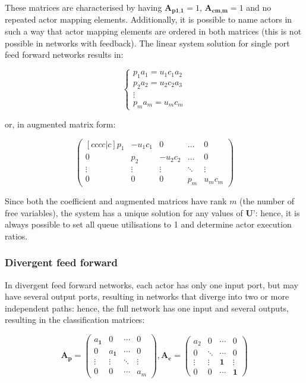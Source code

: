 These matrices are characterised by having $\textbf{A}_{\textbf{p1,1}}=1$, $\textbf{A}_{\textbf{cm,m}}=1$ and no repeated actor mapping elements. Additionally, it is possible to name actors in such a way that actor mapping elements are ordered in both matrices (this is not possible in networks with feedback). The linear system solution for single port feed forward networks results in:

\begin{equation}
 \begin{cases} 
 p_1a_1=u_1c_1 a_2 \\
p_2 a_2=u_2 c_2 a_3 \\
\vdots \\
p_m a_m=u_m  c_m
\end{cases}
\label{eq:solvable}
\end{equation}

or, in augmented matrix form:

\begin{equation}
\begin{pmatrix}[cccc|c]
  p_1 & -u_1c_1 & 0 & \hdots & 0   \\
  0 & p_2 & -u_2c_2 & \hdots  &0  \\
  \vdots & \vdots &  \vdots & \ddots & \vdots \\
  0 & 0 & 0 & p_m & u_mc_m  
 \end{pmatrix}
\end{equation}

Since both the coefficient and augmented matrices have rank $m$ (the number of free variables), the system has a unique solution for any values of $\textbf{U'}$: hence, it is always possible to set all queue utilisations to 1 and determine actor execution ratios.
 

\subsubsection{Divergent feed forward}

In divergent feed forward networks, each actor has only one input port, but may have several output ports, resulting in networks that diverge into two or more independent paths: hence, the full network has one input and several outputs, resulting in the classification matrices:

\begin{equation}
\textbf{A}_{\textbf{p}}=
\begin{pmatrix}
   a_{\textbf{1}} & 0& \cdots & 0 \\
   0 & a_{\textbf{1}} & \cdots & 0 \\
   \vdots  & \vdots & \ddots & \vdots  \\
   0 & 0& \cdots & a_{m} 
 \end{pmatrix}
,
\textbf{A}_{\textbf{c}}=
\begin{pmatrix}
   a_{2} & 0& \cdots & 0 \\
   0 & \ddots & \cdots & 0 \\
   \vdots  & \vdots & \textbf{1} & \vdots  \\
   0 & 0& \cdots & \textbf{1} 
 \end{pmatrix}
\end{equation} 

